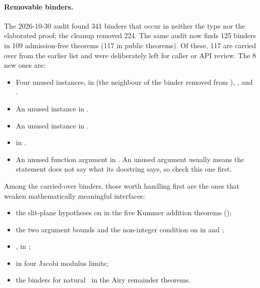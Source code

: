\documentclass[11pt,a4paper]{article}
\begin{document}
\paragraph{Removable binders.}
The 2026-10-30 audit found 341 binders that occur in neither the type nor the elaborated
proof; the cleanup removed 224. The same audit now finds 125 binders in 109 admission-free
theorems (117 in public theorems). Of these, 117 are carried over from the earlier list and
were deliberately left for caller or API review. The 8 new ones are:
\begin{itemize}
  \item Four unused  instances, in
     (the neighbour of the binder removed
    from ),
    , 
    and .
  \item An unused  instance in
    .
  \item An unused  instance in
    .
  \item {} in
    .
  \item An unused function argument  in
    . An unused argument usually means the
    statement does not say what its docstring says, so check this one first.
\end{itemize}
Among the carried-over binders, those worth handling first are the ones that weaken
mathematically meaningful interfaces:
\begin{itemize}
  \item the slit-plane hypotheses on  in the five Kummer addition theorems
    ();
  \item the two argument bounds and the non-integer condition on  in
     and ;
  \item {},  in ;
  \item {} in four Jacobi modulus limits;
  \item the  binders for natural~ in the Airy remainder theorems.
\end{itemize}
\end{document}
